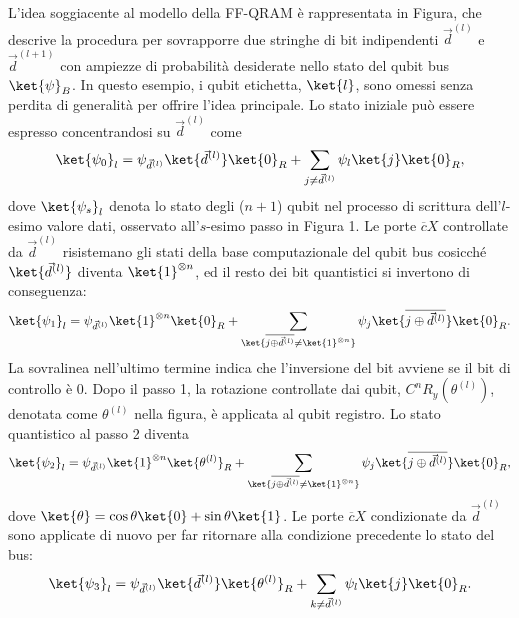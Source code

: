 L'idea soggiacente al modello della \ac{FF-QRAM} è rappresentata in Figura,
che descrive la procedura per sovrapporre due stringhe di bit indipendenti 
$\vec{d}^{(l)}$ e $\vec{d}^{(l+1)}$ con ampiezze di probabilità desiderate 
nello stato del qubit bus $\ket{\psi}_B$. 
In questo esempio, i qubit etichetta, $\ket{l}$, sono omessi senza perdita 
di generalità per offrire l'idea principale. 
Lo stato iniziale può essere espresso concentrandosi su $\vec{d}^{(l)}$ come 
\begin{equation}
    \ket{\psi_0}_l = \psi_{\vec{d}^{(l)}} \ket{\vec{d}^{(l)}} \ket{0}_R + \sum_{j \neq \vec{d}^{(l)}} 
    \psi_l \ket{j} \ket{0}_R,
\end{equation}
dove $\ket{\psi_s}_l$ denota lo stato degli ($n+1$) qubit nel processo di 
scrittura dell'$l$-esimo valore dati, osservato all'$s$-esimo passo in Figura 1. 
Le porte $\overline{c}X$ controllate da $\vec{d}^{(l)}$ risistemano gli stati 
della base computazionale del qubit bus cosicché $\ket{\vec{d}^{(l)}}$ diventa 
$\ket{1}^{\otimes n}$, ed il resto dei bit quantistici si invertono di conseguenza: 
\begin{equation}
    \ket{\psi_1}_l = \psi_{\vec{d}^{(l)}}\ket{1}^{\otimes n} \ket{0}_R + 
    \sum_{\ket{\overline{j \oplus \vec{d}^{(l)}} \neq \ket{1}^{\otimes n} }} \psi_j \ket{\overline{j \oplus \vec{d}^{(l)}}} 
    \ket{0}_R.
\end{equation}
La sovralinea nell'ultimo termine indica che l'inversione del bit avviene se il 
bit di controllo è 0. Dopo il passo 1, la rotazione controllate dai qubit, 
$C^n R_y(\theta^{(l)})$, denotata come $\theta^{(l)}$ nella figura, è applicata 
al qubit registro. Lo stato quantistico al passo 2 diventa 
\begin{equation}
    \ket{\psi_2}_l = \psi_{\vec{d}^{(l)}} \ket{1}^{\otimes n} \ket{\theta^{(l)}}_R + 
    \sum_{\ket{\overline{j \oplus \vec{d}^{(l)}} \neq \ket{1}^{\otimes n} }} \psi_j \ket{\overline{j \oplus \vec{d}^{(l)}}} 
    \ket{0}_R,
\end{equation}
dove $\ket{\theta}=\cos\theta\ket{0}+\sin\theta\ket{1}$. 
Le porte $\overline{c}X$ condizionate da $\vec{d}^{(l)}$ sono applicate di nuovo 
per far ritornare alla condizione precedente lo stato del bus: 
\begin{equation}
    \ket{\psi_3}_l = \psi_{\vec{d}^{(l)}} \ket{\vec{d}^{(l)}} \ket{\theta^{(l)}}_R + 
    \sum_{k \neq \vec{d}^{(l)}} \psi_l \ket{j} \ket{0}_R.
\end{equation}
